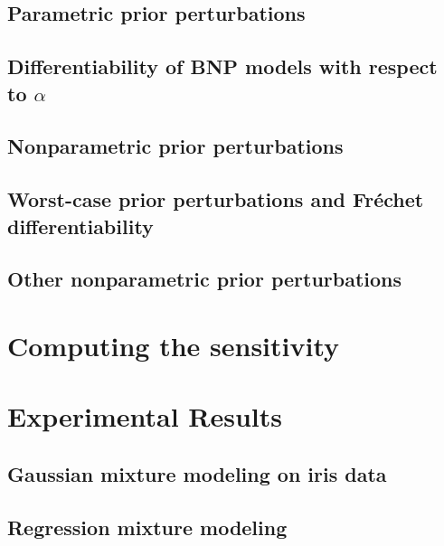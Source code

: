 \documentclass[11pt]{article}
\begin{document}
    \subsection{Parametric prior perturbations}
    

    \subsection{Differentiability of BNP models with respect to $\alpha$}
    

    \subsection{Nonparametric prior perturbations}
    

    \subsection{Worst-case prior perturbations and Fr{\'e}chet differentiability}
    

    \subsection{Other nonparametric prior perturbations}
    


\section{Computing the sensitivity}


\section{Experimental Results}


    \subsection{Gaussian mixture modeling on iris data}
    

    \subsection{Regression mixture modeling}
    
\end{document}
